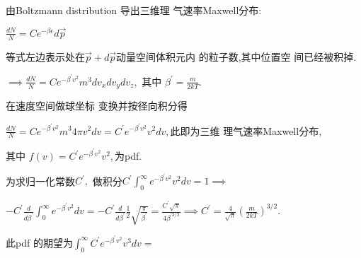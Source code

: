 \documentclass{ctexart}
\begin{document}
由Boltzmann distribution 导出三维理%
气速率Maxwell分布:

$\frac{dN}{N}=Ce^{-\beta \epsilon }d\vec{p}$

等式左边表示处在$\vec{p}+d%
\vec{p}$动量空间体积元内%
的粒子数,其中位置空%
间已经被积掉.

$\implies \frac{dN}{N}=Ce^{-\beta ^{\prime }v^{2}}m^{3}dv_{x}dv_{y}dv_{z},$%
其中 $\beta ^{\prime }=\frac{m}{2kT}.$

在速度空间做球坐标%
变换并按径向积分得

$\frac{dN}{N}=Ce^{-\beta ^{\prime }v^{2}}m^{3}4\pi v^{2}dv=C^{\prime
}e^{-\beta ^{\prime }v^{2}}v^{2}dv,$此即为三维%
理气速率Maxwell分布,

其中 $f\left( v\right) =C^{\prime }e^{-\beta ^{\prime
}v^{2}}v^{2},$为pdf.

为求归一化常数$C^{\prime },$%
做积分\qquad $C^{\prime }\int_{0}^{\infty }e^{-\beta
^{\prime }v^{2}}v^{2}dv=1\implies $

$-C^{\prime }\frac{d}{d\beta ^{\prime }}\int_{0}^{\infty }e^{-\beta ^{\prime
}v^{2}}dv=-C^{\prime }\frac{d}{d\beta ^{\prime }}\frac{1}{2}\sqrt{\frac{\pi 
}{\beta ^{\prime }}}=\frac{C^{\prime }\sqrt{\pi }}{4\beta ^{\prime 3/2}}%
\implies C^{\prime }=\frac{4}{\sqrt{\pi }}\left( \frac{m}{2kT}\right) ^{3/2}.
$

此pdf 的期望为\qquad $\int_{0}^{\infty
}C^{\prime }e^{-\beta ^{\prime }v^{2}}v^{3}dv=$
\end{document}
